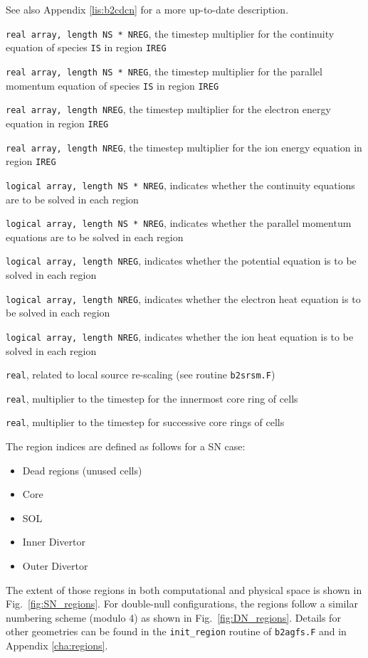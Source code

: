 \documentclass[a4paper,10pt]{report}
\begin{document}
See also Appendix \ref{lis:b2cdcn} for a more up-to-date description.

\begin{description}
\item[DTCO] {\tt real array, length NS * NREG}, the
  timestep multiplier for the continuity equation of species
  {\tt IS} in region {\tt IREG}
\item[DTMO] {\tt real array, length NS * NREG}, the
  timestep multiplier for the parallel momentum equation of species
  {\tt IS} in region {\tt IREG}
\item[DTEE] {\tt real array, length NREG}, the
  timestep multiplier for the electron energy equation in region {\tt IREG}
\item[DTEI] {\tt real array, length NREG}, the
  timestep multiplier for the ion energy equation in region {\tt IREG}
\item[SOLVECO] {\tt logical array, length NS * NREG},
  indicates whether the continuity equations are to be solved in each region
\item[SOLVEMO] {\tt logical array, length NS * NREG},
  indicates whether the parallel momentum equations are to be solved in each region
\item[SOLVEPO] {\tt logical array, length NREG},
  indicates whether the potential equation is to be solved in each region
\item[SOLVEEE] {\tt logical array, length NREG},
  indicates whether the electron heat equation is to be solved in each region
\item[SOLVEEI] {\tt logical array, length NREG},
  indicates whether the ion heat equation is to be solved in each region
\item[TIME\_FACTOR\_REQUIRED]
  {\tt real}, related to local source re-scaling
  (see routine {\tt b2srsm.F})
\item[CORE\_DT\_SUPPRESSION] {\tt real},
  multiplier to the timestep for the innermost core ring of cells
\item[CORE\_DT\_FACTOR] {\tt real},
  multiplier to the timestep for successive core rings of cells
\end{description}

The region indices are defined as follows for a SN case:
\begin{itemize}
  \item[0] Dead regions (unused cells)
  \item[1] Core
  \item[2] SOL
  \item[3] Inner Divertor
  \item[4] Outer Divertor
\end{itemize}
The extent of those regions in both computational and physical space is shown
in Fig.~\ref{fig:SN_regions}. For double-null configurations, the regions
follow a similar numbering scheme (modulo 4) as shown in
Fig.~\ref{fig:DN_regions}. Details for other geometries can be found in the
{\tt init\_region} routine of {\tt b2agfs.F} and in Appendix \ref{cha:regions}.
\end{document}
